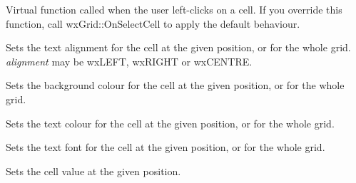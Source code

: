 
Virtual function called when the user left-clicks on a cell. If you override this function,
call wxGrid::OnSelectCell to apply the default behaviour.

\label{wxgridsetcellalignment}



Sets the text alignment for the cell at the given position, or for the whole grid. {\it alignment} may be wxLEFT, wxRIGHT or wxCENTRE.

\label{wxgridsetcellbackgroundcolour}



Sets the background colour for the cell at the given position, or for the whole grid.

\label{wxgridsetcelltextcolour}



Sets the text colour for the cell at the given position, or for the whole grid.

\label{wxgridsetcelltextfont}



Sets the text font for the cell at the given position, or for the whole grid.

\label{wxgridsetcellvalue}


Sets the cell value at the given position.

